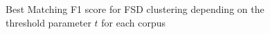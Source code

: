 \begin{figure}
\begin{center}
\quad
{}
\end{center}
\caption{Best Matching F1 score for FSD clustering depending on the threshold parameter $t$ for each corpus}
\label{fig: graph_FSD}
\end{figure}


